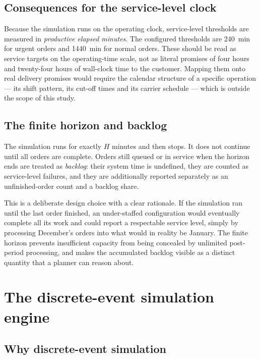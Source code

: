 \subsection{Consequences for the service-level clock}
\label{sec:sla-clock}

Because the simulation runs on the operating clock, service-level thresholds are measured in
\emph{productive elapsed minutes}. The configured thresholds are \SI{240}{\minute} for urgent
orders and \SI{1440}{\minute} for normal orders. These should be read as service targets on the
operating-time scale, not as literal promises of four hours and twenty-four hours of wall-clock
time to the customer. Mapping them onto real delivery promises would require the calendar
structure of a specific operation --- its shift pattern, its cut-off times and its carrier
schedule --- which is outside the scope of this study.

\subsection{The finite horizon and backlog}
\label{sec:finite-horizon}

The simulation runs for exactly \(H\) minutes and then stops. It does not continue until all
orders are complete. Orders still queued or in service when the horizon ends are treated as
\emph{backlog}: their system time is undefined, they are counted as service-level failures, and
they are additionally reported separately as an unfinished-order count and a backlog share.

This is a deliberate design choice with a clear rationale. If the simulation ran until the last
order finished, an under-staffed configuration would eventually complete all its work and could
report a respectable service level, simply by processing December's orders into what would in
reality be January. The finite horizon prevents insufficient capacity from being concealed by
unlimited post-period processing, and makes the accumulated backlog visible as a distinct
quantity that a planner can reason about.

\section{The discrete-event simulation engine}
\label{sec:des-engine}

\subsection{Why discrete-event simulation}

